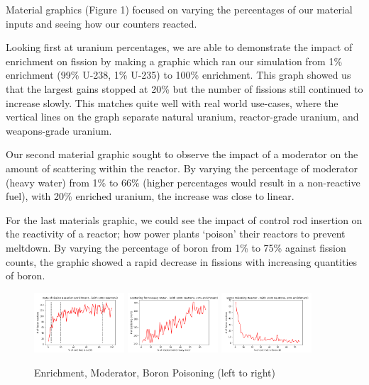 \documentclass{notes}
\begin{document}
Material graphics (Figure 1) focused on varying the percentages of our material inputs and seeing how our counters reacted.

Looking first at uranium percentages, we are able to demonstrate the impact of enrichment on fission by making a graphic which ran our simulation from 1\% enrichment (99\% U-238, 1\% U-235) to 100\% enrichment. This graph showed us that the largest gains stopped at 20\% but the number of fissions still continued to increase slowly. This matches quite well with real world use-cases, where the vertical lines on the graph separate natural uranium, reactor-grade uranium, and weapons-grade uranium.

Our second material graphic sought to observe the impact of a moderator on the amount of scattering within the reactor. By varying the percentage of moderator (heavy water) from 1\% to 66\% (higher percentages would result in a non-reactive fuel), with 20\% enriched uranium, the increase was close to linear.

For the last materials graphic, we could see the impact of control rod insertion on the reactivity of a reactor; how power plants `poison' their reactors to prevent meltdown. By varying the percentage of boron from 1\% to 75\% against fission counts, the graphic showed a rapid decrease in fissions with increasing quantities of boron.

\begin{figure}[H]
    \centering
    \includegraphics[width = 0.3\textwidth]{enrichment.png}
    \includegraphics[width = 0.3\textwidth]{heavy_water.png}
    \includegraphics[width = 0.3\textwidth]{boron.png}
    \caption{Enrichment, Moderator, Boron Poisoning (left to right)}
\end{figure}
\end{document}
